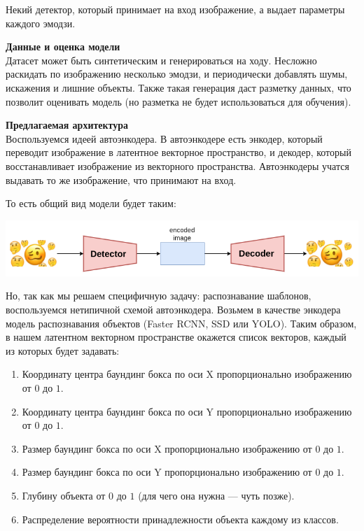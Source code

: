 \documentclass[12pt]{article}
\newenvironment{MyList}[1][4pt]{
	\begin{enumerate}[1.]
		\setlength{\parskip}{0pt}
		\setlength{\itemsep}{#1}
	}{       
	\end{enumerate}
}
\begin{document}
	Некий детектор, который принимает на вход изображение, а выдает параметры каждого эмодзи.
	
	\textbf{Данные и оценка модели}\\
	Датасет может быть синтетическим и генерироваться на ходу. Несложно раскидать по изображению несколько эмодзи, и периодически добавлять шумы, искажения и лишние объекты. Также такая генерация даст разметку данных, что позволит оценивать модель (но разметка не будет использоваться для обучения).
	
	\textbf{Предлагаемая архитектура}\\
	Воспользуемся идеей автоэнкодера. В автоэнкодере есть энкодер, который переводит изображение в латентное векторное пространство, и декодер, который восстанавливает изображение из векторного пространства. Автоэнкодеры учатся выдавать то же изображение, что принимают на вход.
	
	\newpage
	То есть общий вид модели будет таким:
	
	\centerline{\includegraphics[scale=0.6]{images/model_architecture_general.png}}
	
	Но, так как мы решаем специфичную задачу: распознавание шаблонов, воспользуемся нетипичной схемой автоэнкодера. Возьмем в качестве энкодера модель распознавания объектов (Faster RCNN, SSD или YOLO). Таким образом, в нашем латентном векторном пространстве окажется список векторов, каждый из которых будет задавать:
	\begin{MyList}
		\item Координату центра баундинг бокса по оси X пропорционально изображению от $0$ до $1$. 
		\item Координату центра баундинг бокса по оси Y пропорционально изображению от $0$ до $1$.
		\item Размер баундинг бокса по оси X пропорционально изображению от $0$ до $1$.
		\item Размер баундинг бокса по оси Y пропорционально изображению от $0$ до $1$.
		\item Глубину объекта от $0$ до $1$ (для чего она нужна --- чуть позже).
		\item Распределение вероятности принадлежности объекта каждому из классов.
	\end{MyList}
\end{document}

